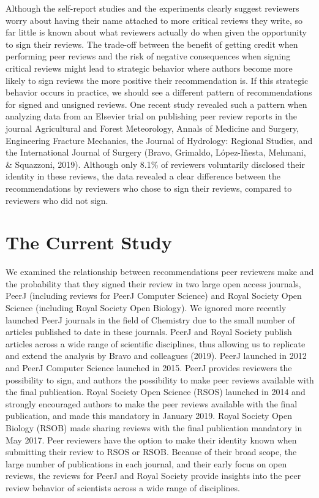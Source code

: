 \documentclass[,jou, a4paper,floatsintext]{apa6}
\begin{document}
Although the self-report studies and the experiments clearly suggest reviewers worry about having their name attached to more critical reviews they write, so far little is known about what reviewers actually do when given the opportunity to sign their reviews. The trade-off between the benefit of getting credit when performing peer reviews and the risk of negative consequences when signing critical reviews might lead to strategic behavior where authors become more likely to sign reviews the more positive their recommendation is. If this strategic behavior occurs in practice, we should see a different pattern of recommendations for signed and unsigned reviews. One recent study revealed such a pattern when analyzing data from an Elsevier trial on publishing peer review reports in the journal Agricultural and Forest Meteorology, Annals of Medicine and Surgery, Engineering Fracture Mechanics, the Journal of Hydrology: Regional Studies, and the International Journal of Surgery (Bravo, Grimaldo, López-Iñesta, Mehmani, \& Squazzoni, 2019). Although only 8.1\% of reviewers voluntarily disclosed their identity in these reviews, the data revealed a clear difference between the recommendations by reviewers who chose to sign their reviews, compared to reviewers who did not sign.

\hypertarget{the-current-study}{%
\section{The Current Study}\label{the-current-study}}

We examined the relationship between recommendations peer reviewers make and the probability that they signed their review in two large open access journals, PeerJ (including reviews for PeerJ Computer Science) and Royal Society Open Science (including Royal Society Open Biology). We ignored more recently launched PeerJ journals in the field of Chemistry due to the small number of articles published to date in these journals. PeerJ and Royal Society publish articles across a wide range of scientific disciplines, thus allowing us to replicate and extend the analysis by Bravo and colleagues (2019). PeerJ launched in 2012 and PeerJ Computer Science launched in 2015. PeerJ provides reviewers the possibility to sign, and authors the possibility to make peer reviews available with the final publication. Royal Society Open Science (RSOS) launched in 2014 and strongly encouraged authors to make the peer reviews available with the final publication, and made this mandatory in January 2019. Royal Society Open Biology (RSOB) made sharing reviews with the final publication mandatory in May 2017. Peer reviewers have the option to make their identity known when submitting their review to RSOS or RSOB. Because of their broad scope, the large number of publications in each journal, and their early focus on open reviews, the reviews for PeerJ and Royal Society provide insights into the peer review behavior of scientists across a wide range of disciplines.
\end{document}
